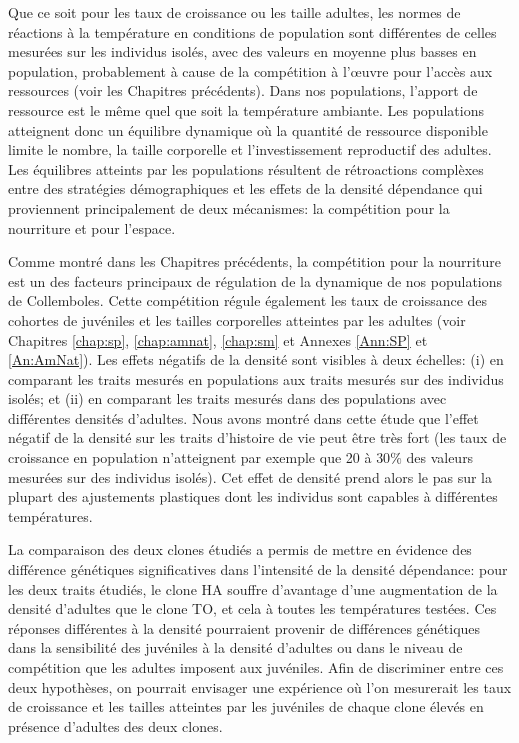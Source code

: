 Que ce soit pour les taux de croissance ou les taille adultes, les normes de
réactions à la température en conditions de population sont différentes de
celles mesurées sur les individus isolés, avec des valeurs en moyenne plus
basses en population, probablement à cause de la compétition à l'\oe{}uvre pour
l'accès aux ressources (voir les Chapitres précédents). Dans nos populations,
l'apport de ressource est le même quel que soit la température ambiante. Les
populations atteignent donc un équilibre dynamique où la quantité de ressource
disponible limite le nombre, la taille corporelle et l'investissement
reproductif des adultes. Les équilibres atteints par les populations résultent
de rétroactions complèxes entre des stratégies démographiques
\autocites[dépendantes des clones,][]{tully2008a,stam1996a} et les effets de la
densité dépendance \autocites{kokko2007a} qui proviennent principalement de deux
mécanismes: la compétition pour la nourriture et pour l'espace. 

Comme montré dans les Chapitres précédents, la compétition pour la nourriture
est un des facteurs principaux de régulation de la dynamique de
nos populations de Collemboles. Cette compétition régule également les taux de
croissance des cohortes de juvéniles et les tailles corporelles atteintes par
les adultes (voir Chapitres \ref{chap:sp}, \ref{chap:amnat}, \ref{chap:sm} et
Annexes \ref{Ann:SP} et \ref{An:AmNat}).
Les effets négatifs de la densité sont visibles à deux échelles: (i) en
comparant les traits mesurés en populations aux traits mesurés sur des individus
isolés; et (ii) en comparant les traits mesurés dans des populations avec
différentes densités d'adultes. Nous avons montré dans cette étude que l'effet
négatif de la densité sur les traits d'histoire de vie peut être très fort (les
taux de croissance en population n'atteignent par exemple que 20 à $30\%$ des
valeurs mesurées sur des individus isolés). Cet effet de densité prend alors le
pas sur la plupart des ajustements plastiques dont les individus sont capables à
différentes températures. 

La comparaison des deux clones étudiés a permis de mettre en évidence des
différence génétiques significatives dans l'intensité de la densité dépendance:
pour les deux traits étudiés, le clone HA souffre d'avantage d'une augmentation
de la densité d'adultes que le clone TO, et cela à toutes les températures
testées. Ces réponses différentes à la densité pourraient provenir de
différences génétiques dans la sensibilité des juvéniles à la densité d'adultes
ou dans le niveau de compétition que les adultes imposent aux juvéniles. Afin de
discriminer entre ces deux hypothèses, on pourrait envisager une expérience où
l'on mesurerait les taux de croissance et les tailles atteintes par les juvéniles
de chaque clone élevés en présence d'adultes des deux clones. 

